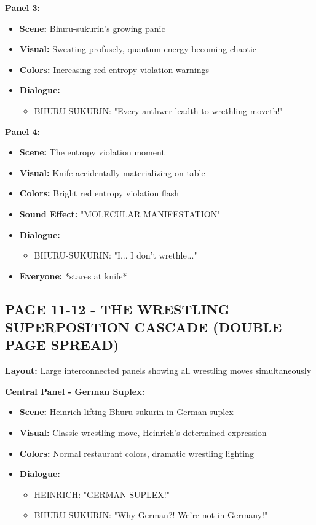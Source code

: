 \documentclass[12pt,a4paper]{article}
\begin{document}
\textbf{Panel 3:}
\begin{itemize}
\item \textbf{Scene:} Bhuru-sukurin's growing panic
\item \textbf{Visual:} Sweating profusely, quantum energy becoming chaotic
\item \textbf{Colors:} Increasing red entropy violation warnings
\item \textbf{Dialogue:}
\begin{itemize}
\item BHURU-SUKURIN: "Every anthwer leadth to wrethling moveth!"
\end{itemize}
\end{itemize}

\textbf{Panel 4:}
\begin{itemize}
\item \textbf{Scene:} The entropy violation moment
\item \textbf{Visual:} Knife accidentally materializing on table
\item \textbf{Colors:} Bright red entropy violation flash
\item \textbf{Sound Effect:} "MOLECULAR MANIFESTATION"
\item \textbf{Dialogue:}
\begin{itemize}
\item BHURU-SUKURIN: "I... I don't wrethle..."
\end{itemize}
\item \textbf{Everyone:} *stares at knife*
\end{itemize}

\subsection{PAGE 11-12 - THE WRESTLING SUPERPOSITION CASCADE (DOUBLE PAGE SPREAD)}

\textbf{Layout:} Large interconnected panels showing all wrestling moves simultaneously

\textbf{Central Panel - German Suplex:}
\begin{itemize}
\item \textbf{Scene:} Heinrich lifting Bhuru-sukurin in German suplex
\item \textbf{Visual:} Classic wrestling move, Heinrich's determined expression
\item \textbf{Colors:} Normal restaurant colors, dramatic wrestling lighting
\item \textbf{Dialogue:}
\begin{itemize}
\item HEINRICH: "GERMAN SUPLEX!"
\item BHURU-SUKURIN: "Why German?! We're not in Germany!"
\end{itemize}
\end{itemize}
\end{document}
